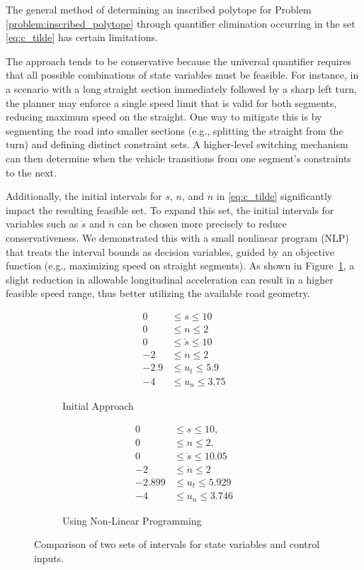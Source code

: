 The general method of determining an inscribed polytope for Problem \ref{problem:inscribed_polytope} through quantifier elimination occurring in the
set \ref{eq:c_tilde} has certain limitations.

The approach tends to be conservative because the universal quantifier requires that all possible combinations of state variables must be feasible.
For instance, in a scenario with a long straight section immediately followed by a sharp left turn, the planner may enforce a single speed limit that
is valid for both segments, reducing maximum speed on the straight.
One way to mitigate this is by segmenting the road into smaller sections (e.g., splitting the straight from the turn) and defining distinct
constraint sets.
A higher-level switching mechanism can then determine when the vehicle transitions from one segment's constraints to the next.

Additionally, the initial intervals for $s$, $n$, and $\dot{n}$ in \eqref{eq:c_tilde} significantly impact the resulting feasible set.
To expand this set, the initial intervals for variables such as $\dot{s}$ and $\dot{n}$ can be chosen more precisely to reduce conservativeness.
We demonstrated this with a small nonlinear program (NLP) that treats the interval bounds as decision variables, guided by an objective function
(e.g., maximizing speed on straight segments).
As shown in Figure~\ref{fig:resulting_intervals_comparison}, a slight reduction in allowable longitudinal acceleration can result in a higher
feasible speed range, thus better utilizing the available road geometry.

\begin{figure}[h]
	\centering
	\begin{subfigure}[b]{0.45\textwidth}
		\centering
		\begin{align*}
			0    & \leq s \leq 10       \\
			0    & \leq n \leq 2        \\
			0    & \leq \dot{s} \leq 10 \\
			-2   & \leq \dot{n} \leq 2  \\
			-2.9 & \leq u_t \leq 5.9    \\
			-4   & \leq u_n \leq 3.75
		\end{align*}
		\caption{Initial Approach}
	\end{subfigure}
	\hfill
	\begin{subfigure}[b]{0.45\textwidth}
		\centering
		\begin{align*}
			0      & \leq s \leq 10,         \\
			0      & \leq n \leq 2,          \\
			0      & \leq \dot{s} \leq 10.05 \\
			-2     & \leq \dot{n} \leq 2     \\
			-2.899 & \leq u_t \leq 5.929     \\
			-4     & \leq u_n \leq 3.746
		\end{align*}
		\caption{Using Non-Linear Programming}
	\end{subfigure}
	\caption{Comparison of two sets of intervals for state variables and control inputs.}
	\label{fig:resulting_intervals_comparison}
\end{figure}


